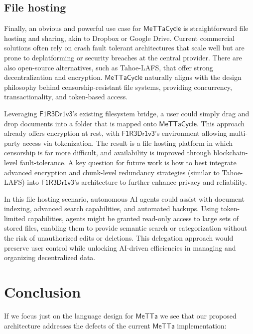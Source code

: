 \documentclass{article}
\newcommand{\MC}{\mathsf{MeTTaCycle}}
\newcommand{\FD}{\mathsf{F1R3Dr1v3}}
\begin{document}
\subsection{File hosting}

Finally, an obvious and powerful use case for $\MC$ is straightforward file hosting and sharing, akin to Dropbox or Google Drive. Current commercial solutions often rely on crash fault tolerant architectures that scale well but are prone to deplatforming or security breaches at the central provider. There are also open-source alternatives, such as Tahoe-LAFS, that offer strong decentralization and encryption. $\MC$ naturally aligns with the design philosophy behind censorship-resistant file systems, providing concurrency, transactionality, and token-based access.

Leveraging $\FD$'s existing filesystem bridge, a user could simply drag and drop documents into a folder that is mapped onto $\MC$. This approach already offers encryption at rest, with $\FD$'s environment allowing multi-party access via tokenization. The result is a file hosting platform in which censorship is far more difficult, and availability is improved through blockchain-level fault-tolerance. A key question for future work is how to best integrate advanced encryption and chunk-level redundancy strategies (similar to Tahoe-LAFS) into $\FD$'s architecture to further enhance privacy and reliability.

In this file hosting scenario, autonomous AI agents could assist with document indexing, advanced search capabilities, and automated backups. Using token-limited capabilities, agents might be granted read-only access to large sets of stored files, enabling them to provide semantic search or categorization without the risk of unauthorized edits or deletions. This delegation approach would preserve user control while unlocking AI-driven efficiencies in managing and organizing decentralized data.

\section{Conclusion}

If we focus just on the language design for $\mathsf{MeTTa}$ we see
that our proposed architecture addresses the defects of the current
$\mathsf{MeTTa}$ implementation:
\end{document}
